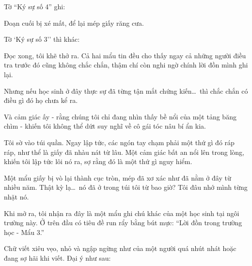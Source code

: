 \documentclass[../main.tex]{subfiles}
\begin{document}
Tờ ``{\vnmsans Ký sự số 4}'' ghi:


Đoạn cuối bị xé mất, để lại mép giấy răng cưa.

Tờ `{\vnmsans Ký sự số 3}'' thì khác:


Đọc xong, tôi khẽ thở ra. Cả hai mẩu tin đều cho thấy ngay cả những người điều tra trước đó cũng không chắc chắn, thậm chí còn nghi ngờ chính lời đồn mình ghi lại.

Nhưng nếu học sinh ở đây thực sự đã từng tận mắt chứng kiến\dots\ thì chắc chắn có điều gì đó họ chưa kể ra.

Và cảm giác ấy - rằng chúng tôi chỉ đang nhìn thấy bề nổi của một tảng băng chìm - khiến tôi không thể dứt suy nghĩ về cô gái tóc nâu bí ẩn kia.

Tôi sờ vào túi quần. Ngay lập tức, các ngón tay chạm phải một thứ gì đó ráp ráp, như thể là giấy đã nhàu nát từ lâu. Một cảm giác bất an nổi lên trong lòng, khiến tôi lập tức lôi nó ra, sợ rằng đó là một thứ gì nguy hiểm.

Một mẩu giấy bị vò lại thành cục tròn, mép đã xơ xác như đã nằm ở đây từ nhiều năm. Thật kỳ lạ\dots\ nó đã ở trong túi tôi từ bao giờ? Tôi đâu nhớ mình từng nhặt nó.

Khi mở ra, tôi nhận ra đây là một mẩu ghi chú khác của một học sinh tại ngôi trường này. Ở trên đầu có tiêu đề run rẩy bằng bút mực: ``{\vnmsans Lời đồn trong trường học - Mẩu 3}.''

Chữ viết xiêu vẹo, nhỏ và ngập ngừng như của một người quá nhút nhát hoặc đang sợ hãi khi viết. Đại ý như sau:

\end{document}
